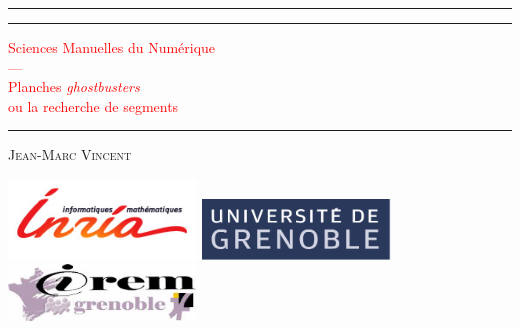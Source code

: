 \documentclass[a4paper,12pt]{article}
\begin{document}
\thispagestyle{empty}
\newlength{\drop} %
\textheight %

\rule{\textwidth}{1pt}\par %
\vspace{2pt}\vspace{-\baselineskip} %
\rule{\textwidth}{0.4pt}\par %

\vspace{\drop} %
\centering %
\textcolor{Red}{ %
{\Huge Sciences Manuelles du Numérique}\\[0.5\baselineskip] %
{\Large ---}\\[0.75\baselineskip] %
{\Huge Planches  \textit{ghostbusters}}\\ %
{\large ou la recherche de segments}}

\vspace{0.25\drop} %
\rule{0.3\textwidth}{0.4pt}\par %
\vspace{\drop} %

{\Large \textsc{Jean-Marc Vincent}}\par %

\vfill %
\includegraphics[width=5cm]{logo-inria-scientifique-couleur.jpg} \hfill \includegraphics[width=5cm]{logoblanc-fond-encre2lignes.pdf}\hfill \includegraphics[width=5cm]{Irem.png}
\vspace*{\drop} %
\end{document}
